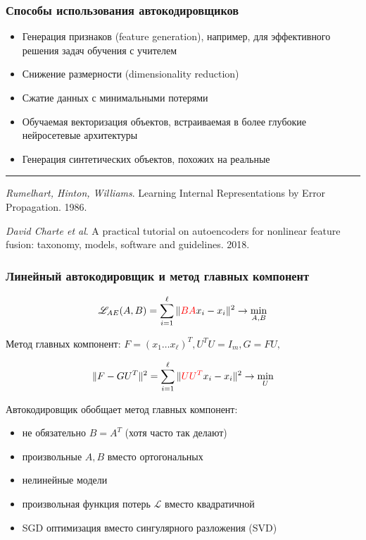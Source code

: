 \documentclass[fullscreen=true, bookmarks=true, hyperref={pdfencoding=unicode}]{beamer}
\begin{document}
\begin{frame}
  \frametitle{Способы использования автокодировщиков}
  \begin{itemize}
    \item Генерация признаков (feature generation), например, для эффективного решения задач обучения с учителем
    \item Снижение размерности (dimensionality reduction)
    \item Сжатие данных с минимальными потерями
    \item Обучаемая векторизация объектов, встраиваемая в более глубокие нейросетевые архитектуры
    \item Генерация синтетических объектов, похожих на реальные
  \end{itemize}

  \noindent\rule{8cm}{0.4pt}

  {\small
  {\it Rumelhart, Hinton, Williams}. Learning Internal Representations by Error Propagation. 1986.

  {\it David Charte et al}. A practical tutorial on autoencoders for nonlinear feature fusion: taxonomy, models, software and guidelines. 2018.}

\end{frame}


\begin{frame}
  \frametitle{Линейный автокодировщик и метод главных компонент}

  $$ \mathscr{L}_{AE}(A, B) = \sum\limits_{i = 1}^\ell \|{\color{red}BA}x_i - x_i \|^2 \to \min\limits_{A,B}$$


  Метод главных компонент:  $F = (x_1\dots x_\ell)^T, U^TU = I_m, G = FU,$

  $$ \|F - GU^T \|^2 = \sum\limits_{i = 1}^\ell \|{\color{red}UU^T}x_i - x_i \|^2 \to \min\limits_{U}$$

  Автокодировщик обобщает метод главных компонент:
  \begin{itemize}
    \item не обязательно $B=A^T$ (хотя часто так делают)
    \item произвольные $A, B$ вместо ортогональных
    \item нелинейные модели
    \item произвольная функция потерь $\mathscr{L}$ вместо квадратичной
    \item SGD оптимизация вместо сингулярного разложения (SVD)
  \end{itemize}
\end{frame}
\end{document}

